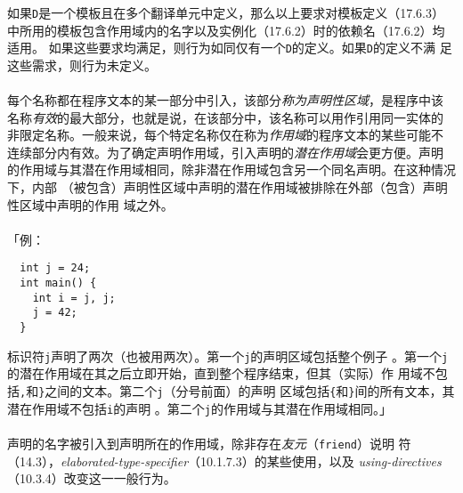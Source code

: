 如果\texttt{D}是一个模板且在多个翻译单元中定义，那么以上要求对模板定义（17.6.3）
中所用的模板包含作用域内的名字以及实例化（17.6.2）时的依赖名（17.6.2）均适用。
如果这些要求均满足，则行为如同仅有一个\texttt{D}的定义。如果\texttt{D}的定义不满
足这些需求，则行为未定义。



\paragraph{}
每个名称都在程序文本的某一部分中引入，该部分\textit{称为声明性区域}，是程序中该
名称\textit{有效}的最大部分，也就是说，在该部分中，该名称可以用作引用同一实体的
非限定名称。一般来说，每个特定名称仅在称为\textit{作用域}的程序文本的某些可能不
连续部分内有效。为了确定声明作用域，引入声明的\textit{潜在作用域}会更方便。声明
的作用域与其潜在作用域相同，除非潜在作用域包含另一个同名声明。在这种情况下，内部
（被包含）声明性区域中声明的潜在作用域被排除在外部（包含）声明性区域中声明的作用
域之外。

\paragraph{}
「例：
\begin{lstlisting}
  int j = 24;
  int main() {
    int i = j, j;
    j = 42;
  }
\end{lstlisting}
标识符\texttt{j}声明了两次（也被用两次）。第一个\texttt{j}的声明区域包括整个例子
。第一个\texttt{j}的潜在作用域在其之后立即开始，直到整个程序结束，但其（实际）作
用域不包括\texttt{,}和\texttt{\}}之间的文本。第二个\texttt{j}（分号前面）的声明
区域包括\texttt{\{}和\texttt{\}}间的所有文本，其潜在作用域不包括\texttt{i}的声明
。第二个\texttt{j}的作用域与其潜在作用域相同。」

\paragraph{}
声明的名字被引入到声明所在的作用域，除非存在\textit{友元}（\texttt{friend}）说明
符（14.3），\textit{elaborated-type-specifier}（10.1.7.3）的某些使用，以及
\textit{using-directives}（10.3.4）改变这一一般行为。

